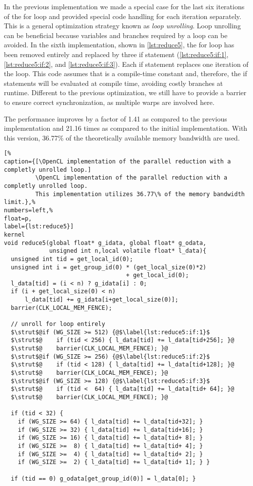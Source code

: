 In the previous implementation we made a special case for the last six iterations of the for loop and provided special code handling for each iteration separately.
This is a general optimization strategy known as \emph{loop unrolling}.
Loop unrolling can be beneficial because variables and branches required by a loop can be avoided.
In the sixth implementation, shown in \autoref{lst:reduce5}, the for loop has been removed entirely and replaced by three if statement (\autoref{lst:reduce5:if:1}, \autoref{lst:reduce5:if:2}, and \autoref{lst:reduce5:if:3}).
Each if statement replaces one iteration of the loop.
This code assumes that  is a compile-time constant and, therefore, the if statements will be evaluated at compile time, avoiding costly branches at runtime.
Different to the previous optimization, we still have to provide a barrier to ensure correct synchronization, as multiple warps are involved here.

The performance improves by a factor of 1.41 as compared to the previous implementation and 21.16 times as compared to the initial implementation.
With this version, 36.77\% of the theoretically available memory bandwidth are used.

\begin{lstlisting}[%
caption={[\OpenCL implementation of the parallel reduction with a completly unrolled loop.]
         \OpenCL implementation of the parallel reduction with a completly unrolled loop.
         This implementation utilizes 36.77\% of the memory bandwidth limit.},%
numbers=left,%
float=p,
label={lst:reduce5}]
kernel
void reduce5(global float* g_idata, global float* g_odata,
             unsigned int n,local volatile float* l_data){
  unsigned int tid = get_local_id(0);
  unsigned int i = get_group_id(0) * (get_local_size(0)*2)
                                   + get_local_id(0);
  l_data[tid] = (i < n) ? g_idata[i] : 0;
  if (i + get_local_size(0) < n)
      l_data[tid] += g_idata[i+get_local_size(0)];
  barrier(CLK_LOCAL_MEM_FENCE);

  // unroll for loop entirely
  $\strut$@if (WG_SIZE >= 512) {@$\label{lst:reduce5:if:1}$
  $\strut$@    if (tid < 256) { l_data[tid] += l_data[tid+256]; }@
  $\strut$@    barrier(CLK_LOCAL_MEM_FENCE); }@
  $\strut$@if (WG_SIZE >= 256) {@$\label{lst:reduce5:if:2}$
  $\strut$@    if (tid < 128) { l_data[tid] += l_data[tid+128]; }@
  $\strut$@    barrier(CLK_LOCAL_MEM_FENCE); }@
  $\strut$@if (WG_SIZE >= 128) {@$\label{lst:reduce5:if:3}$
  $\strut$@    if (tid <  64) { l_data[tid] += l_data[tid+ 64]; }@
  $\strut$@    barrier(CLK_LOCAL_MEM_FENCE); }@

  if (tid < 32) {
    if (WG_SIZE >= 64) { l_data[tid] += l_data[tid+32]; }
    if (WG_SIZE >= 32) { l_data[tid] += l_data[tid+16]; }
    if (WG_SIZE >= 16) { l_data[tid] += l_data[tid+ 8]; }
    if (WG_SIZE >=  8) { l_data[tid] += l_data[tid+ 4]; }
    if (WG_SIZE >=  4) { l_data[tid] += l_data[tid+ 2]; }
    if (WG_SIZE >=  2) { l_data[tid] += l_data[tid+ 1]; } }

  if (tid == 0) g_odata[get_group_id(0)] = l_data[0]; }
\end{lstlisting}



